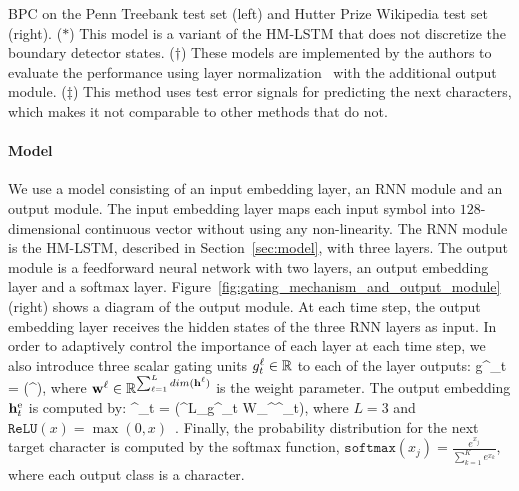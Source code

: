\documentclass{article} %
\begin{document}
\begin{table}[t]
{    }
    \caption{BPC on the Penn Treebank test set (left) and Hutter Prize Wikipedia test set (right).
             ($*$) This model is a variant of the HM-LSTM that does not discretize the boundary detector states.
             ($\dagger$) These models are implemented by the authors to evaluate 
             the performance using layer normalization~\citep{ba2016layer}
             with the additional output module. 
             ($\ddagger$) This method uses test error signals for predicting the next characters,
             which makes it not comparable to other methods that do not.
         }
    \label{tab:ptb_wiki_bpc}
\end{table}

\paragraph{Model}
We use a model consisting of an input embedding layer, an RNN module and an output module.
The input embedding layer maps each input symbol into $128$-dimensional continuous vector without
using any non-linearity.
The RNN module is the HM-LSTM, described in Section~\ref{sec:model}, with three layers. 
The output module is a feedforward neural network with two layers, an output embedding layer
and a softmax layer. 
Figure~\ref{fig:gating_mechanism_and_output_module} (right) shows a diagram of the output module. 
At each time step, the output embedding layer receives the hidden states of the three RNN layers as input. 
In order to adaptively control the importance of each layer at each time step, 
we also introduce three scalar gating units $g_t^\ell \in \mathbb{R}$ to each of the layer outputs:
\bea
	\label{eq:scaling_unit}
	g^\ell_t = (\bw^\ell[\bh^1_t;\cdots;\bh^L_t]),
\eea
where ${\bf w}^\ell\in\mathbb{R}^{\sum^L_{\ell=1} dim({\bf h}^\ell)}$ is the weight parameter. 
The output embedding ${\bf h}_t^\text{e}$ is computed by:
\bea
	\label{eq:output_module}
	\bh^{}_t = \left(\sum^{L}_{}g^{\ell}_t W_{\ell}^{}\bh^{\ell}_t\right),
\eea
where $L=3$ and $\mathtt{ReLU}(x)=\max(0, x)$~\citep{nair2010rectified}. 
Finally, the probability distribution for the next target character is computed by the softmax function,
{\small $\mathtt{softmax}(x_j)=\frac{e^{x_j}}{\sum^K_{k=1} e^{x_k}}$}, where each output class is a character.
\end{document}
